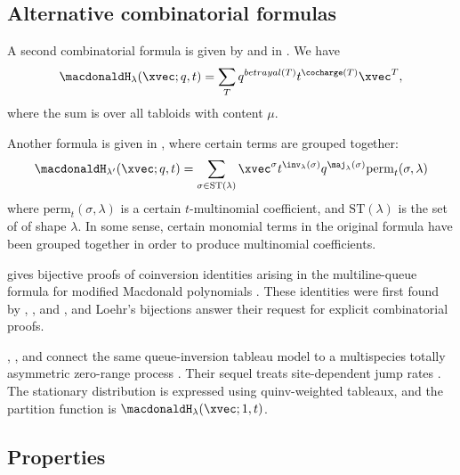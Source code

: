 



\subsection[macdonaldHCombinatorialFormula2]{Alternative combinatorial formulas}

A second combinatorial formula is given by  and
 in \cite{KaliszewskiMorse2019}.
We have
\[
\macdonaldH_{\lambda}(\xvec;q,t) = \sum_{T} q^{betrayal(T)} t^{\cocharge(T)} \xvec^T,
\]
where the sum is over all tabloids with content $\mu$.


Another formula is given in \cite{CorteelMandelshtamMasonWilliams2022},
where certain terms are grouped together:
\[
\macdonaldH_{\lambda'}(\xvec;q,t) = \sum_{\sigma \in \mathrm{ST}(\lambda)}
\xvec^\sigma t^{\inv_\lambda(\sigma)} q^{\maj_\lambda(\sigma)}
\mathrm{perm}_t(\sigma,\lambda)
\]
where $\mathrm{perm}_t(\sigma,\lambda)$ is a certain $t$-multinomial
coefficient, and $\mathrm{ST}(\lambda)$ is the set of
\label{sortedTableauxMacdonald} of shape $\lambda$.
In some sense, certain monomial terms in the original formula have been
grouped together in order to produce multinomial coefficients.

 gives bijective proofs of coinversion identities
arising in the multiline-queue formula for modified Macdonald polynomials
\cite{Loehr2025}.  These identities were first found by
, , and , and
Loehr's bijections answer their request for explicit combinatorial proofs.

, , and 
connect the same queue-inversion tableau model to a multispecies totally
asymmetric zero-range process \cite{AyyerMandelshtamMartin2023}.  Their
sequel treats site-dependent jump rates
\cite{AyyerMandelshtamMartin2024}.  The stationary distribution is expressed
using quinv-weighted tableaux, and the partition function is
$\macdonaldH_\lambda(\xvec;1,t)$.


\subsection[macdonaldHProperties]{Properties}


